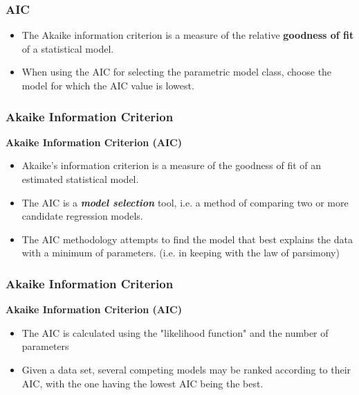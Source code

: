 \documentclass[PredictiveAnalytics101.tex]{subfiles}
\begin{document}
	\begin{frame}
		\frametitle{AIC}
		\Large
		\begin{itemize}
			\item The Akaike information criterion is a measure of the relative \textbf{goodness of fit} of a statistical model.
			
			\item When using the AIC for selecting the parametric model class, choose
			the model for which the AIC value is lowest.
		\end{itemize}
	\end{frame}
	\begin{frame}
		\frametitle{Akaike Information Criterion}
		\Large
		\textbf{Akaike Information Criterion (AIC)}
		\begin{itemize}
			\item Akaike's information criterion is a measure of the goodness of fit of
			an estimated statistical model. 
			\item The AIC is a \textbf{\textit{model selection}} tool, i.e. a method of comparing two
			or more candidate regression models. 
			\item The AIC methodology attempts to find the model that best explains the data with a minimum of parameters. (i.e. in keeping with the law of parsimony)
		\end{itemize}
		
	\end{frame}
	\begin{frame}
		\frametitle{Akaike Information Criterion}
		\Large
		\textbf{Akaike Information Criterion (AIC)}
		\begin{itemize}
			\item The AIC is calculated using the "likelihood function" and the number of parameters 
			\item Given a data set, several competing models may be ranked according to their AIC, with the one having the lowest AIC being the best. 
	
		\end{itemize}
		
	\end{frame}
\end{document}
